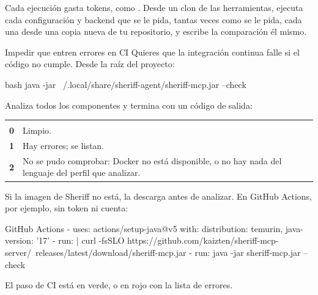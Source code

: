 \documentclass[11pt,a4paper]{article}
\begin{document}
\begin{warning}
Cada ejecución gasta tokens, como . Desde un clon de las
herramientas,  ejecuta cada
configuración y backend que se le pida, tantas veces como se le pida, cada una
desde una copia nueva de tu repositorio, y escribe la comparación él mismo.
\end{warning}

\begin{play}{Impedir que entren errores en CI}
\when Quieres que la integración continua falle si el código no cumple.
\asks Desde la raíz del proyecto:
\begin{command}{bash}
java -jar ~/.local/share/sheriff-agent/sheriff-mcp.jar --check
\end{command}
\happens Analiza todos los componentes y termina con un código de salida:

\begin{center}
\begin{tabularx}{0.9\linewidth}{@{\hspace{6pt}}>{\ttfamily\bfseries}p{12mm}L}
\headrow {} &  \\
0 & Limpio. \\
1 & Hay errores; se listan. \\
2 & No se pudo comprobar: Docker no está disponible, o no hay nada del lenguaje
    del perfil que analizar. \\
\end{tabularx}
\end{center}

Si la imagen de Sheriff no está, la descarga antes de analizar. En GitHub
Actions, por ejemplo, sin token ni cuenta:

\begin{command}{GitHub Actions}
- uses: actions/setup-java@v5
  with: { distribution: temurin, java-version: '17' }
- run: |
    curl -fsSLO https://github.com/kaizten/sheriff-mcp-server/\
    releases/latest/download/sheriff-mcp.jar
- run: java -jar sheriff-mcp.jar --check
\end{command}
\done El paso de CI está en verde, o en rojo con la lista de errores.
\end{play}
\end{document}
